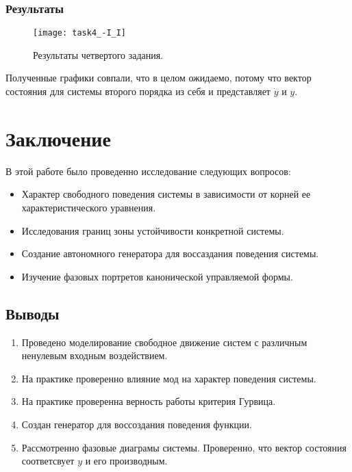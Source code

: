 \documentclass[16pt]{article}
\begin{document}
\newpage
\subsubsection{Результаты}
\begin{figure}[H]
	\centering
	\texttt{[image: task4\_-I\_I]}
	\caption{Результаты четвертого задания.}
	\label{fig:fig9}
\end{figure}
Полученные графики совпали, что в целом ожидаемо, потому что вектор состояния для системы второго порядка из себя и представляет \(\dot{y}\) и \(y\).

\newpage

\section{Заключение}
В этой работе было проведенно исследование следующих вопросов:
\begin{itemize}
    \item Характер свободного поведения системы в зависимости от корней ее характеристического уравнения. 
    \item Исследования границ зоны устойчивости конкретной системы. 
    \item Создание автономного генератора для воссаздания поведения системы. 
    \item Изучение фазовых портретов канонической управляемой формы.
\end{itemize} 
\subsection{Выводы}
\begin{enumerate}
   \item Проведено моделирование свободное движение систем с различным ненулевым входным воздействием.
   \item На практике проверенно влияние мод на характер поведения системы.
   \item На практике проверенна верность работы критерия Гурвица.
   \item Создан генератор для воссоздания поведения функции.
   \item Рассмотренно фазовые диаграмы системы. Проверенно, что вектор состояния соответсвует \(y\) и его производным. 
\end{enumerate}
\end{document}
